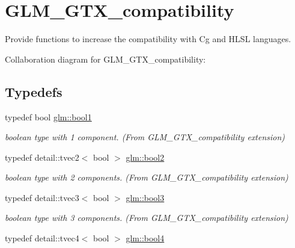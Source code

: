 \hypertarget{group__gtx__compatibility}{}\section{G\+L\+M\+\_\+\+G\+T\+X\+\_\+compatibility}
\label{group__gtx__compatibility}


Provide functions to increase the compatibility with Cg and H\+L\+S\+L languages.  


Collaboration diagram for G\+L\+M\+\_\+\+G\+T\+X\+\_\+compatibility\+:
\subsection*{Typedefs}
\begin{DoxyCompactItemize}
\item 
\hypertarget{group__gtx__compatibility_gab65f19f5170f95a2f06d6aa6482c9405}{}typedef bool \hyperlink{group__gtx__compatibility_gab65f19f5170f95a2f06d6aa6482c9405}{glm\+::bool1}\label{group__gtx__compatibility_gab65f19f5170f95a2f06d6aa6482c9405}

\begin{DoxyCompactList}\small\item\em boolean type with 1 component. (From G\+L\+M\+\_\+\+G\+T\+X\+\_\+compatibility extension) \end{DoxyCompactList}\item 
\hypertarget{group__gtx__compatibility_gae39b632fcf30109d47fa76904f4a308c}{}typedef detail\+::tvec2$<$ bool $>$ \hyperlink{group__gtx__compatibility_gae39b632fcf30109d47fa76904f4a308c}{glm\+::bool2}\label{group__gtx__compatibility_gae39b632fcf30109d47fa76904f4a308c}

\begin{DoxyCompactList}\small\item\em boolean type with 2 components. (From G\+L\+M\+\_\+\+G\+T\+X\+\_\+compatibility extension) \end{DoxyCompactList}\item 
\hypertarget{group__gtx__compatibility_gaab332dbd8f4589935265c51c9e5ce699}{}typedef detail\+::tvec3$<$ bool $>$ \hyperlink{group__gtx__compatibility_gaab332dbd8f4589935265c51c9e5ce699}{glm\+::bool3}\label{group__gtx__compatibility_gaab332dbd8f4589935265c51c9e5ce699}

\begin{DoxyCompactList}\small\item\em boolean type with 3 components. (From G\+L\+M\+\_\+\+G\+T\+X\+\_\+compatibility extension) \end{DoxyCompactList}\item 
\hypertarget{group__gtx__compatibility_ga4517874bd04ede11ad7c0c528baaa95f}{}typedef detail\+::tvec4$<$ bool $>$ \hyperlink{group__gtx__compatibility_ga4517874bd04ede11ad7c0c528baaa95f}{glm\+::bool4}\label{group__gtx__compatibility_ga4517874bd04ede11ad7c0c528baaa95f}


\end{DoxyCompactItemize}
